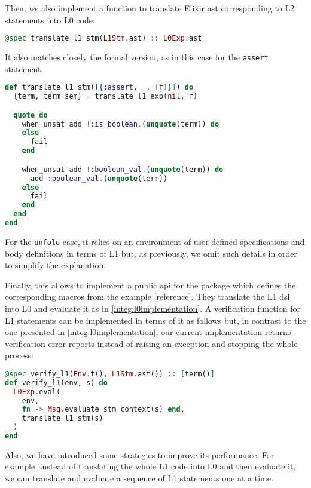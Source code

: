 Then, we also implement a function to translate Elixir \gls{ast} corresponding
to L2 statements into L0 code:

\begin{lstlisting}[language=elixir,numbers=none,frame=none]
@spec translate_l1_stm(L1Stm.ast) :: L0Exp.ast
\end{lstlisting}

It also matches closely the formal version, as in this case for the 
\verb|assert| statement:

\begin{lstlisting}[language=elixir,numbers=none,frame=none]
def translate_l1_stm([{:assert, _, [f]}]) do
  {term, term_sem} = translate_l1_exp(nil, f)

  quote do
    when_unsat add !:is_boolean.(unquote(term)) do
    else
      fail
    end

    when_unsat add !:boolean_val.(unquote(term)) do
      add :boolean_val.(unquote(term))
    else
      fail
    end
  end
end
\end{lstlisting}

For the \verb|unfold| case, it relies on an environment of user defined specifications
and body definitions in terms of L1 but, as previously, we omit such details in order 
to simplify the explanation.

Finally, this allows to implement a public \gls{api} for the package which defines 
the corresponding macros from the example [reference]. They translate the L1 \gls{dsl} 
into L0 and evaluate it as in \ref{integ:l0implementation}. A verification function 
for L1 statements can be implemented in terms of it as follows but, in contrast to the 
one presented in \ref{integ:l0implementation}, our current implementation returns 
verification error reports instead of raising an exception and stopping the whole 
process:

\begin{lstlisting}[language=elixir,numbers=none,frame=none]
@spec verify_l1(Env.t(), L1Stm.ast()) :: [term()]
def verify_l1(env, s) do
  L0Exp.eval(
    env,
    fn -> Msg.evaluate_stm_context(s) end,
    translate_l1_stm(s)
  )
end
\end{lstlisting}

Also, we have introduced some strategies to improve its performance. For example, 
instead of translating the whole L1 code into L0 and then 
evaluate it, we can translate and evaluate a sequence of L1 statements one at a time.
